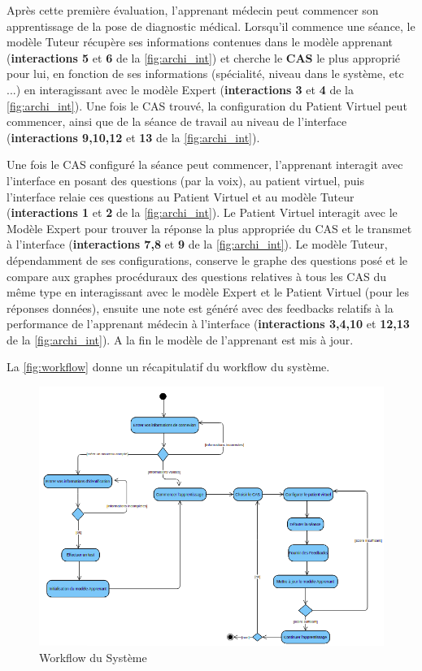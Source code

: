 Après cette première évaluation, l'apprenant médecin peut commencer son apprentissage de la pose de diagnostic médical. Lorsqu'il commence une séance, le modèle Tuteur récupère ses informations contenues dans le modèle apprenant (\textbf{interactions 5} et \textbf{6} de la \autoref{fig:archi_int}) et cherche le \textbf{CAS} le plus approprié pour lui, en fonction de ses informations (spécialité, niveau dans le système, etc ...) en interagissant avec le modèle Expert (\textbf{interactions 3} et \textbf{4} de la \autoref{fig:archi_int}). Une fois le CAS trouvé, la configuration du Patient Virtuel peut commencer, ainsi que de la séance de travail au niveau de l'interface (\textbf{interactions 9,10,12} et \textbf{13} de la \autoref{fig:archi_int}).

Une fois le CAS configuré la séance peut commencer, l'apprenant interagit avec l'interface en posant des questions (par la voix), au patient virtuel, puis l'interface relaie ces questions au Patient Virtuel et au modèle Tuteur (\textbf{interactions 1} et \textbf{2} de la \autoref{fig:archi_int}). Le Patient Virtuel interagit avec le Modèle Expert pour trouver la réponse la plus appropriée du CAS et le transmet à l'interface (\textbf{interactions 7,8} et \textbf{9} de la \autoref{fig:archi_int}). Le modèle Tuteur, dépendamment de ses configurations, conserve le graphe des questions posé et le compare aux graphes procéduraux des questions relatives à tous les CAS du même type en interagissant avec le modèle Expert et le Patient Virtuel (pour les réponses données), ensuite une note est généré avec des feedbacks relatifs à la performance de l'apprenant médecin à l'interface  (\textbf{interactions 3,4,10} et \textbf{12,13} de la \autoref{fig:archi_int}). A la fin le modèle de l'apprenant est mis à jour.

La \autoref{fig:workflow} donne un récapitulatif du workflow du système.



\begin{figure}[H]
        \centering
        \hspace*{-0.6in}
        \includegraphics[width=1.2\textwidth]{figures/worflow_STI.png}
        \captionsetup{justification=centering}
        \caption{Workflow du Système}
        \label{fig:workflow}
\end{figure}


